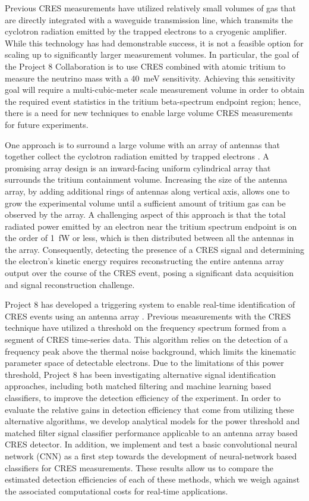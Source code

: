 Previous CRES measurements have utilized relatively small volumes of gas that are directly integrated with a waveguide transmission line, which transmits the cyclotron radiation emitted by the trapped electrons to a cryogenic amplifier. While this technology has had demonstrable success, it is not a feasible option for scaling up to significantly larger measurement volumes. In particular, the goal of the Project 8 Collaboration is to use CRES combined with atomic tritium to measure the neutrino mass with a 40~meV sensitivity. Achieving this sensitivity goal will require a multi-cubic-meter scale measurement volume in order to obtain the required event statistics in the tritium beta-spectrum endpoint region; hence, there is a need for new techniques to enable large volume CRES measurements for future experiments.

One approach is to surround a large volume with an array of antennas that together collect the cyclotron radiation emitted by trapped electrons \cite{p8snowmass2022, p8PanicProc}. A promising array design is an inward-facing uniform cylindrical array that surrounds the tritium containment volume. Increasing the size of the antenna array, by adding additional rings of antennas along vertical axis, allows one to grow the experimental volume until a sufficient amount of tritium gas can be observed by the array. A challenging aspect of this approach is that the total radiated power emitted by an electron near the tritium spectrum endpoint is on the order of 1~fW or less, which is then distributed between all the antennas in the array. Consequently, detecting the presence of a CRES signal and determining the electron's kinetic energy requires reconstructing the entire antenna array output over the course of the CRES event, posing a significant data acquisition and signal reconstruction challenge.

Project 8 has developed a triggering system to enable real-time identification of CRES events using an antenna array \cite{p8daqIII}. Previous measurements with the CRES technique have utilized a threshold on the frequency spectrum formed from a segment of CRES time-series data. This algorithm relies on the detection of a frequency peak above the thermal noise background, which limits the kinematic parameter space of detectable electrons. Due to the limitations of this power threshold, Project 8 has been investigating alternative signal identification approaches, including both matched filtering and machine learning based classifiers, to improve the detection efficiency of the experiment. In order to evaluate the relative gains in detection efficiency that come from utilizing these alternative algorithms, we develop analytical models for the power threshold and matched filter signal classifier performance applicable to an antenna array based CRES detector. In addition, we implement and test a basic convolutional neural network (CNN) as a first step towards the development of neural-network based classifiers for CRES measurements. These results allow us to compare the estimated detection efficiencies of each of these methods, which we weigh against the associated computational costs for real-time applications.

